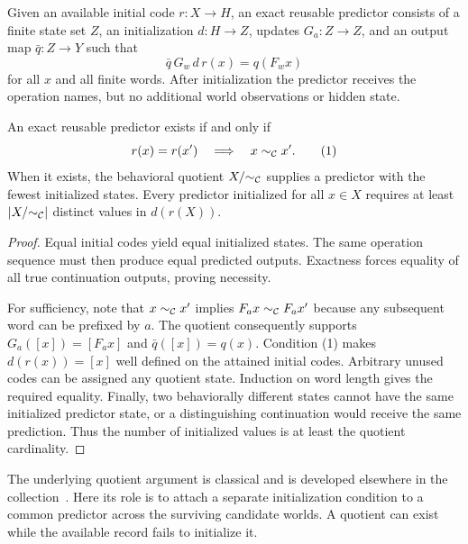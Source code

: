 \begin{GAdefinition}\label{GA:def:initialization}
Given an available initial code $r:X\to H$, an exact reusable predictor consists of a finite state set $Z$, an initialization $d:H\to Z$, updates $G_a:Z\to Z$, and an output map $\bar q:Z\to Y$ such that
\[
\bar q\,G_w\,d\,r(x)=q(F_wx)
\]
for all $x$ and all finite words. After initialization the predictor receives the operation names, but no additional world observations or hidden state.
\end{GAdefinition}

\begin{GAtheorem}\label{GA:thm:grounding}
An exact reusable predictor exists if and only if
\[
r(x)=r(x')\quad\Longrightarrow\quad x\sim_\mathcal C x'.\tag{1}
\]
When it exists, the behavioral quotient $X/{\sim_\mathcal C}$ supplies a predictor with the fewest initialized states. Every predictor initialized for all $x\in X$ requires at least $|X/{\sim_\mathcal C}|$ distinct values in $d(r(X))$.
\end{GAtheorem}
\begin{proof}
Equal initial codes yield equal initialized states. The same operation sequence must then produce equal predicted outputs. Exactness forces equality of all true continuation outputs, proving necessity.

For sufficiency, note that $x\sim_\mathcal C x'$ implies $F_ax\sim_\mathcal C F_ax'$ because any subsequent word can be prefixed by $a$. The quotient consequently supports $G_a([x])=[F_ax]$ and $\bar q([x])=q(x)$. Condition (1) makes $d(r(x))=[x]$ well defined on the attained initial codes. Arbitrary unused codes can be assigned any quotient state. Induction on word length gives the required equality. Finally, two behaviorally different states cannot have the same initialized predictor state, or a distinguishing continuation would receive the same prediction. Thus the number of initialized values is at least the quotient cardinality.
\end{proof}

The underlying quotient argument is classical and is developed elsewhere in the collection~\cite{GA:understanding,GA:resolution}. Here its role is to attach a separate initialization condition to a common predictor across the surviving candidate worlds. A quotient can exist while the available record fails to initialize it.

